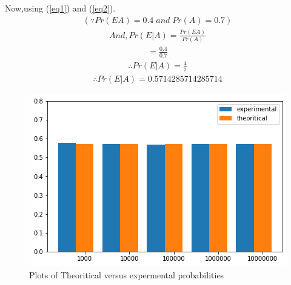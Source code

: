 \documentclass[journal,12pt,twocolumn]{IEEEtran}
\begin{document}
Now,using (\ref{eq1}) and (\ref{eq2}). 
\begin{align}
  (\because Pr(EA)=0.4\; and \; Pr(A)=0.7)  
\end{align}
\begin{align}
And, Pr(E|A)=\frac{Pr(EA)}{Pr(A)}
\end{align}
\begin{align}
=\frac{0.4}{0.7}
\end{align}
\begin{align}
\therefore Pr(E|A)=\frac{4}{7}    
\end{align}
\begin{align}
\therefore Pr(E|A)=0.5714285714285714    
\end{align}
\begin{figure}
   \caption{Plots of Theoritical versus expermental probabilities}
    \centering
    \includegraphics[width=\columnwidth]
    {Figure.png}
\end{figure}
\end{document}
